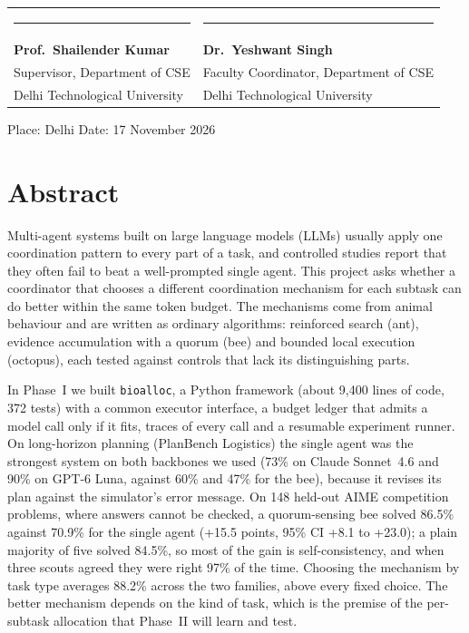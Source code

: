 \documentclass[12pt,a4paper]{article}
\begin{document}
\vspace{1.8cm}
\noindent
\begin{tabular}{@{}p{}p{}@{}}
\rule{4.5cm}{0.4pt} & \rule{4.5cm}{0.4pt} \\
\textbf{Prof.~Shailender Kumar} & \textbf{Dr.~Yeshwant Singh} \\
Supervisor, Department of CSE & Faculty Coordinator, Department of CSE \\
Delhi Technological University & Delhi Technological University \\
\end{tabular}

\vspace{0.4cm}
\noindent Place: Delhi \hfill Date: 17 November 2026

\clearpage
\section*{Abstract}
Multi-agent systems built on large language models (LLMs) usually apply one coordination pattern to
every part of a task, and controlled studies report that they often fail to beat a well-prompted
single agent. This project asks whether a coordinator that chooses a different coordination mechanism
for each subtask can do better within the same token budget. The mechanisms come from animal behaviour
and are written as ordinary algorithms: reinforced search (ant), evidence accumulation with a quorum
(bee) and bounded local execution (octopus), each tested against controls that lack its distinguishing
parts.

In Phase~I we built \texttt{bioalloc}, a Python framework (about 9,400 lines of code, 372 tests) with
a common executor interface, a budget ledger that admits a model call only if it fits, traces of every
call and a resumable experiment runner. On long-horizon planning (PlanBench Logistics) the single agent
was the strongest system on both backbones we used (73\% on Claude Sonnet~4.6 and 90\% on GPT-6 Luna,
against 60\% and 47\% for the bee), because it revises its plan against the simulator's error message.
On 148 held-out AIME competition problems, where answers cannot be checked, a quorum-sensing bee solved
86.5\% against 70.9\% for the single agent (+15.5 points, 95\% CI +8.1 to +23.0); a plain majority of
five solved 84.5\%, so most of the gain is self-consistency, and when three scouts agreed they were
right 97\% of the time. Choosing the mechanism by task type averages 88.2\% across the two families,
above every fixed choice. The better mechanism depends on the kind of task, which is the premise of
the per-subtask allocation that Phase~II will learn and test.
\end{document}
